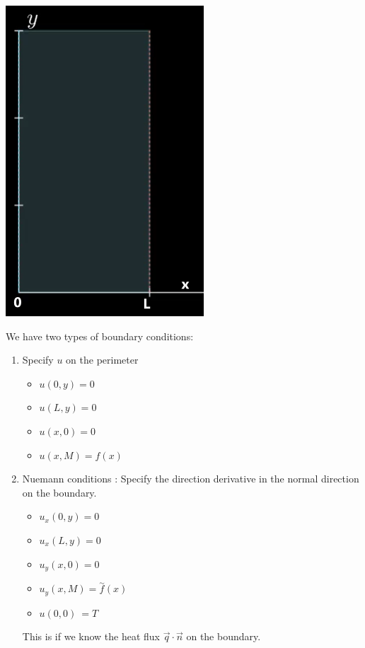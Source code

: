 \documentclass{article}
\newcommand{\twiddle}[1]{\overset{\sim}{#1}}
\begin{document}
\begin{enumerate}
  \begin{center}
    \includegraphics{Laplaces}
  \end{center}

  We have two types of boundary conditions:
  \begin{enumerate}
    \item Specify $u$ on the perimeter
    \begin{itemize}
      \item $u(0, y) = 0$
      \item $u(L, y) = 0$
      \item $u(x, 0) = 0$
      \item $u(x, M) = f(x)$
    \end{itemize}
    \item Nuemann conditions : Specify the direction derivative in the normal direction on the boundary.
    \begin{itemize}
      \item $u_x(0, y) = 0$
      \item $u_x(L, y) = 0$
      \item $u_y(x, 0) = 0$
      \item $u_y(x, M) = \twiddle{f}(x)$
      \item $u(0, 0)\  = T$
    \end{itemize}
    This is if we know the heat flux $\vec q \cdot \vec n$ on the boundary.
  \end{enumerate}
\end{enumerate}
\newpage
\end{document}
